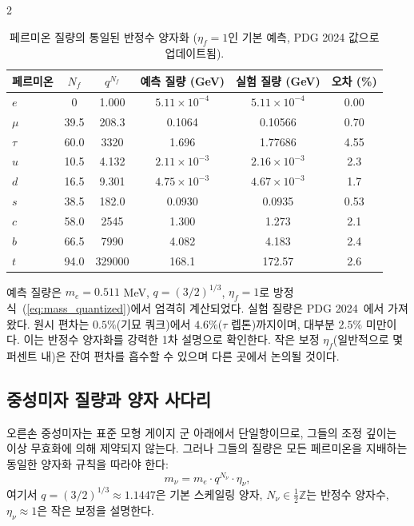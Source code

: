 \documentclass[11pt,a4paper]{article}
\begin{document}
\begin{multicols}{2}
		\begin{table}[H]
			\centering
			\caption{페르미온 질량의 통일된 반정수 양자화 (\(\eta_f=1\)인 기본 예측, PDG 2024 값으로 업데이트됨).}
			\label{tab:fermions_new}
			\tiny  
			\begin{tabular}{l c c c c c}
				\toprule
				페르미온 & \(N_f\) & \(q^{N_f}\) & 예측 질량 (GeV) & 실험 질량 (GeV) & 오차 (\%) \\
				\midrule
				\(e\)   & 0      & 1.000 & \(5.11\times10^{-4}\) & \(5.11\times10^{-4}\) & 0.00 \\
				\(\mu\)  & 39.5   & 208.3 & 0.1064                & 0.10566              & 0.70 \\
				\(\tau\) & 60.0   & 3320  & 1.696                 & 1.77686              & 4.55 \\
				\(u\)   & 10.5   & 4.132 & \(2.11\times10^{-3}\)   & \(2.16\times10^{-3}\)  & 2.3 \\
				\(d\)   & 16.5   & 9.301 & \(4.75\times10^{-3}\)   & \(4.67\times10^{-3}\)  & 1.7 \\
				\(s\)   & 38.5   & 182.0 & 0.0930                & 0.0935               & 0.53 \\
				\(c\)   & 58.0   & 2545  & 1.300                 & 1.273                & 2.1 \\
				\(b\)   & 66.5   & 7990  & 4.082                 & 4.183                & 2.4 \\
				\(t\)   & 94.0   & 329000& 168.1                 & 172.57               & 2.6 \\
				\bottomrule
			\end{tabular}
			\par\smallskip
			\footnotesize 
			예측 질량은 \(m_e = 0.511\) MeV, \(q = (3/2)^{1/3}\), \(\eta_f = 1\)로 방정식~(\ref{eq:mass_quantized})에서 엄격히 계산되었다. 
			실험 질량은 PDG 2024~\cite{PDG2024}에서 가져왔다. 
			원시 편차는 \(0.5\%\)(기묘 쿼크)에서 \(4.6\%\)(\(\tau\) 렙톤)까지이며, 대부분 \(2.5\%\) 미만이다. 
			이는 반정수 양자화를 강력한 1차 설명으로 확인한다. 
			작은 보정 \(\eta_f\)(일반적으로 몇 퍼센트 내)은 잔여 편차를 흡수할 수 있으며 다른 곳에서 논의될 것이다.
		\end{table}
		
		\subsection{중성미자 질량과 양자 사다리}
		
		오른손 중성미자는 표준 모형 게이지 군 아래에서 단일항이므로, 그들의 조정 깊이는 이상 무효화에 의해 제약되지 않는다. 그러나 그들의 질량은 모든 페르미온을 지배하는 동일한 양자화 규칙을 따라야 한다:
		\begin{equation}
			m_\nu = m_e \cdot q^{N_\nu} \cdot \eta_\nu,
			\label{eq:neutrino_mass}
		\end{equation}
		여기서 $q = (3/2)^{1/3} \approx 1.1447$은 기본 스케일링 양자, $N_\nu \in \frac{1}{2}\mathbb{Z}$는 반정수 양자수, $\eta_\nu \approx 1$은 작은 보정을 설명한다.
		

\end{multicols}
\end{document}
